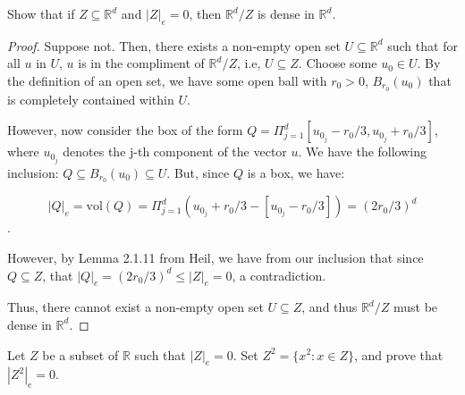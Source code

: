\documentclass[10pt]{article}
\newenvironment{problem}[2][Problem]{\begin{trivlist}
\item[\hskip \labelsep {\bfseries #1}\hskip \labelsep {\bfseries #2.}]}{\end{trivlist}}
\begin{document}
\begin{problem}{2.1.30}
Show that if $Z \subseteq \mathbb{R}^d$ and $|Z|_e = 0$, then $\mathbb{R}^d/Z$ is dense in $\mathbb{R}^d$.
\end{problem}

\begin{proof}[Proof]
Suppose not. Then, there exists a non-empty open set $U \subseteq \mathbb{R}^d$ such that for all $u$ in $U$, $u$ is in the compliment of $\mathbb{R}^d/Z$, i.e, $U \subseteq Z$. Choose some $u_0 \in U$. By the definition of an open set, we have some open ball with $r_0 > 0$, $B_{r_0}(u_0)$ that is completely contained within $U$.

However, now consider the box of the form $Q = \Pi_{j=1}^d [u_{0_j}-r_0/3,u_{0_j}+r_0/3]$, where $u_{0_j}$ denotes the j-th component of the vector $u$. We have the following inclusion: $Q \subseteq B_{r_0}(u_0) \subseteq U$. But, since $Q$ is a box, we have:

$$ |Q|_e = \text{vol}(Q) =  \Pi_{j=1}^d (u_{0_j}+r_0/3 - [u_{0_j}-r_0/3]) = (2r_0/3)^d$$.

However, by Lemma 2.1.11 from Heil, we have from our inclusion that since $Q \subseteq Z$, that $|Q|_e =  (2r_0/3)^d \leq |Z|_e = 0$, a contradiction.

Thus, there cannot exist a non-empty open set $U \subseteq Z$, and thus $\mathbb{R}^d/Z$ must be dense in $\mathbb{R}^d$.
\end{proof}

\begin{problem}{2.1.31}
Let $Z$ be a subset of $\mathbb{R}$ such that $|Z|_e = 0$. Set $Z^2 = \{ x^2 : x \in Z \}$, and prove that $|Z^2|_e = 0$.
\end{problem}
\end{document}
